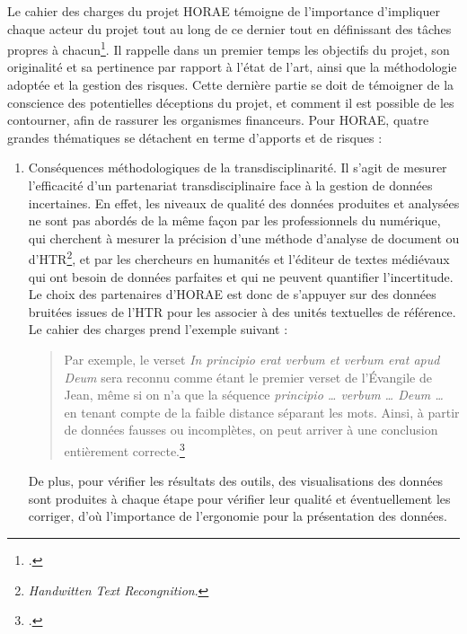 \documentclass[a4paper,12pt,twoside]{book}
\begin{document}
	Le cahier des charges du projet HORAE témoigne de l'importance d'impliquer chaque acteur du projet tout au long de ce dernier tout en définissant des tâches propres à chacun\footcite{HORAE_projet}.  Il rappelle dans un premier temps les objectifs du projet, son originalité et sa pertinence par rapport à l'état de l'art, ainsi que la méthodologie adoptée et la gestion des risques. Cette dernière partie se doit de témoigner de la conscience des potentielles déceptions du projet, et comment il est possible de les contourner, afin de rassurer les organismes financeurs. Pour HORAE, quatre grandes thématiques se détachent en terme d'apports et de risques : 
	\begin{enumerate}
	    \item \og Conséquences méthodologiques de la transdisciplinarité\fg{}. Il s'agit de mesurer l'efficacité d'un partenariat transdisciplinaire face à la gestion de données incertaines. En effet, les niveaux de qualité des données produites et analysées ne sont pas abordés de la même façon par les professionnels du numérique, qui cherchent à mesurer la précision d'une méthode d'analyse de document ou d'HTR\footnote{\textit{Handwitten Text Recongnition}.}, et par les chercheurs en humanités et l'éditeur de textes médiévaux qui ont besoin de données parfaites et qui ne peuvent quantifier l'incertitude. Le choix des partenaires d'HORAE est donc de s'appuyer sur des données \og bruitées\fg{} issues de l'HTR pour les associer à des unités textuelles de référence. Le cahier des charges prend l'exemple suivant : 
	    \begin{quote}
Par exemple, le verset \og \textit{In principio erat verbum et verbum erat apud Deum}\fg{} sera reconnu comme étant le premier verset de l’Évangile de Jean, même si on n’a que la séquence \og \textit{principio … verbum … Deum …}\fg{} en tenant compte de la faible distance séparant les mots. Ainsi, à partir de données fausses ou incomplètes, on peut arriver à une conclusion entièrement correcte.\footcite[p. 9]{HORAE_projet}
	    \end{quote}
	    De plus, pour vérifier les résultats des outils, des visualisations des données sont produites à chaque étape pour vérifier leur qualité et éventuellement les corriger, d'où l'importance de l'ergonomie pour la présentation des données. 

\end{enumerate}
\end{document}
